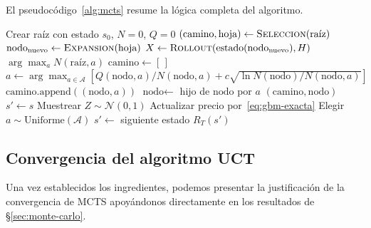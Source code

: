 El pseudocódigo~\ref{alg:mcts} resume la lógica completa del algoritmo.

\begin{algorithm}[H]
\caption{Monte Carlo Tree Search (UCT)}
\label{alg:mcts}
\begin{algorithmic}[1]
    \State Crear raíz con estado $s_0$, $N = 0$, $Q = 0$
        \State $(\text{camino}, \text{hoja}) \gets \Call{Seleccion}{\text{raíz}}$ 
        \State $\text{nodo}_{\text{nuevo}} \gets \Call{Expansion}{\text{hoja}}$
        \State $X \gets \Call{Rollout}{\text{estado}(\text{nodo}_{\text{nuevo}}), H}$
        \State {}
    \EndFor
    \State \Return $\arg\max_{a} N(\text{raíz}, a)$ 
\EndFunction
\Statex
{}
    \State $\text{camino} \gets [\,]$
        \State $a \gets \arg\max_{a \in \mathcal{A}} \left[ Q(\text{nodo},a)/N(\text{nodo},a) + c\sqrt{\ln N(\text{nodo}) / N(\text{nodo},a)} \right]$
        \State $\text{camino.append}((\text{nodo}, a))$
        \State $\text{nodo} \gets$ hijo de $\text{nodo}$ por $a$
    \EndWhile
    \State \Return $(\text{camino}, \text{nodo})$
\EndFunction
\Statex
{}
    \State $s' \gets s$
        \State Muestrear $Z \sim \mathcal{N}(0,1)$
        \State Actualizar precio por~\eqref{eq:gbm-exacta}
        \State Elegir $a \sim \text{Uniforme}(\mathcal{A})$
        \State $s' \gets$ siguiente estado
    \EndFor
    \State \Return $R_T(s')$ 
\EndFunction
\end{algorithmic}
\end{algorithm}

\subsection{Convergencia del algoritmo UCT}
\label{subsec:convergencia-uct}

Una vez establecidos los ingredientes, podemos presentar la justificación de la convergencia de MCTS apoyándonos directamente en los resultados de §\ref{sec:monte-carlo}.

